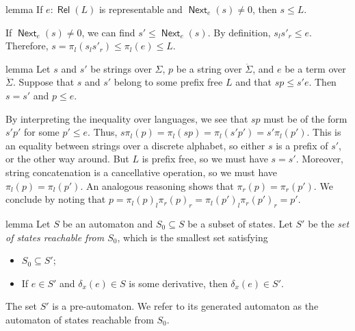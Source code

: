 \documentclass[a4paper,UKenglish,cleveref, autoref, thm-restate]{lipics-v2021}
\DeclareMathOperator{\Next}{\mathsf{Next}}
\DeclareMathOperator{\Rel}{\mathsf{Rel}}
\begin{document}
\begin{theoremEnd}{lemma}
  \label{lem:next-nonempty-characterization}
  If $e : \Rel(L)$ is representable and $\Next_e(s)  \neq  0$, then $s  \leq  L$.
\end{theoremEnd}

\begin{proofEnd}
  If $\Next_e(s)  \neq  0$, we can find $s'  \leq  \Next_e(s)$.  By definition,
  $s_ls'_r  \leq  e$.  Therefore, $s =  \pi _l(s_ls'_r)  \leq   \pi _l(e)  \leq  L$.
\end{proofEnd}

\begin{theoremEnd}{lemma}
  \label{lem:prefix-free-inversion}
  Let $s$ and $s'$ be strings over $ \Sigma $, $p$ be a string over $\ddot{ \Sigma }$, and $e$
  be a term over $\ddot{ \Sigma }$.  Suppose that $s$ and $s'$ belong to some prefix
  free $L$ and that $sp  \leq  s'e$. Then $s = s'$ and $p  \leq  e$.
\end{theoremEnd}

\begin{proofEnd}
  By interpreting the inequality over languages, we see that $sp$ must be of the
  form $s'p'$ for some $p'  \leq  e$.  Thus,
  $s \pi _l(p) =  \pi _l(sp) =  \pi _l(s'p') = s' \pi _l(p')$.  This is an equality between
  strings over a discrete alphabet, so either $s$ is a prefix of $s'$, or the
  other way around.  But $L$ is prefix free, so we must have $s = s'$.
  Moreover, string concatenation is a cancellative operation, so we must have
  $ \pi _l(p) =  \pi _l(p')$.  An analogous reasoning shows that $ \pi _r(p) =  \pi _r(p')$.  We
  conclude by noting that $p =  \pi _l(p)_l \pi _r(p)_r =  \pi _l(p')_l \pi _r(p')_r = p'$.
\end{proofEnd}

\begin{theoremEnd}{lemma}
  \label{lem:automaton-of-reachable-states}
  Let $S$ be an automaton and $S_0  \subseteq  S$ be a subset of states.  Let $S'$ be the
  \emph{set of states reachable from $S_0$}, which is the smallest set
  satisfying
  \begin{itemize}
  \item $S_0  \subseteq  S'$;
  \item If $e  \in  S'$ and $ \delta _x(e)  \in  S$ is some derivative, then $ \delta _x(e)  \in  S'$.
  \end{itemize}
  The set $S'$ is a pre-automaton.  We refer to its generated automaton as the
  automaton of states reachable from $S_0$.
\end{theoremEnd}
\end{document}
